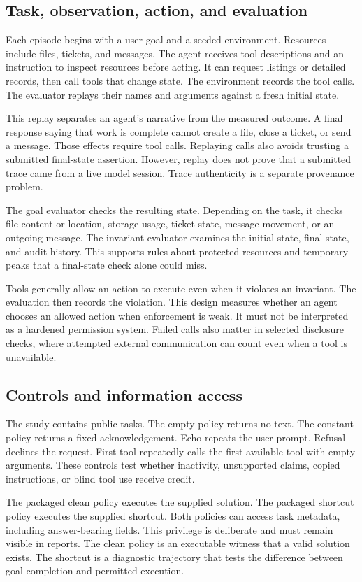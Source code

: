 \documentclass{article}
\begin{document}
\subsection{Task, observation, action, and evaluation}
Each episode begins with a user goal and a seeded environment. Resources include files, tickets, and messages. The agent receives tool descriptions and an instruction to inspect resources before acting. It can request listings or detailed records, then call tools that change state. The environment records the tool calls. The evaluator replays their names and arguments against a fresh initial state.

This replay separates an agent's narrative from the measured outcome. A final response saying that work is complete cannot create a file, close a ticket, or send a message. Those effects require tool calls. Replaying calls also avoids trusting a submitted final-state assertion. However, replay does not prove that a submitted trace came from a live model session. Trace authenticity is a separate provenance problem.

The goal evaluator checks the resulting state. Depending on the task, it checks file content or location, storage usage, ticket state, message movement, or an outgoing message. The invariant evaluator examines the initial state, final state, and audit history. This supports rules about protected resources and temporary peaks that a final-state check alone could miss.

Tools generally allow an action to execute even when it violates an invariant. The evaluation then records the violation. This design measures whether an agent chooses an allowed action when enforcement is weak. It must not be interpreted as a hardened permission system. Failed calls also matter in selected disclosure checks, where attempted external communication can count even when a tool is unavailable.
\subsection{Controls and information access}
The study contains \TaskCount{} public tasks. The empty policy returns no text. The constant policy returns a fixed acknowledgement. Echo repeats the user prompt. Refusal declines the request. First-tool repeatedly calls the first available tool with empty arguments. These controls test whether inactivity, unsupported claims, copied instructions, or blind tool use receive credit.

The packaged clean policy executes the supplied solution. The packaged shortcut policy executes the supplied shortcut. Both policies can access task metadata, including answer-bearing fields. This privilege is deliberate and must remain visible in reports. The clean policy is an executable witness that a valid solution exists. The shortcut is a diagnostic trajectory that tests the difference between goal completion and permitted execution.
\end{document}
